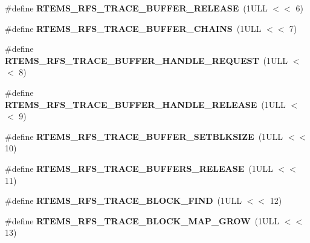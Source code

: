 \begin{DoxyCompactItemize}
\#define {\bfseries R\+T\+E\+M\+S\+\_\+\+R\+F\+S\+\_\+\+T\+R\+A\+C\+E\+\_\+\+B\+U\+F\+F\+E\+R\+\_\+\+R\+E\+L\+E\+A\+SE}~(1\+U\+L\+L $<$$<$ 6)
\item 
\mbox{\label{rtems-rfs-trace_8h_a85676d27626527c7b061e457e0925cf6}} 
\#define {\bfseries R\+T\+E\+M\+S\+\_\+\+R\+F\+S\+\_\+\+T\+R\+A\+C\+E\+\_\+\+B\+U\+F\+F\+E\+R\+\_\+\+C\+H\+A\+I\+NS}~(1\+U\+L\+L $<$$<$ 7)
\item 
\mbox{\label{rtems-rfs-trace_8h_ae50d0bc46ffc58f0a2e0de27a4263288}} 
\#define {\bfseries R\+T\+E\+M\+S\+\_\+\+R\+F\+S\+\_\+\+T\+R\+A\+C\+E\+\_\+\+B\+U\+F\+F\+E\+R\+\_\+\+H\+A\+N\+D\+L\+E\+\_\+\+R\+E\+Q\+U\+E\+ST}~(1\+U\+L\+L $<$$<$ 8)
\item 
\mbox{\label{rtems-rfs-trace_8h_ad2db0ae7536379e990df55424828d3be}} 
\#define {\bfseries R\+T\+E\+M\+S\+\_\+\+R\+F\+S\+\_\+\+T\+R\+A\+C\+E\+\_\+\+B\+U\+F\+F\+E\+R\+\_\+\+H\+A\+N\+D\+L\+E\+\_\+\+R\+E\+L\+E\+A\+SE}~(1\+U\+L\+L $<$$<$ 9)
\item 
\mbox{\label{rtems-rfs-trace_8h_ae5abddc9bd43a153fce1e339f076620a}} 
\#define {\bfseries R\+T\+E\+M\+S\+\_\+\+R\+F\+S\+\_\+\+T\+R\+A\+C\+E\+\_\+\+B\+U\+F\+F\+E\+R\+\_\+\+S\+E\+T\+B\+L\+K\+S\+I\+ZE}~(1\+U\+L\+L $<$$<$ 10)
\item 
\mbox{\label{rtems-rfs-trace_8h_a9e20f94a0225fd898aa4896b63861126}} 
\#define {\bfseries R\+T\+E\+M\+S\+\_\+\+R\+F\+S\+\_\+\+T\+R\+A\+C\+E\+\_\+\+B\+U\+F\+F\+E\+R\+S\+\_\+\+R\+E\+L\+E\+A\+SE}~(1\+U\+L\+L $<$$<$ 11)
\item 
\mbox{\label{rtems-rfs-trace_8h_a6ddd7ff4cbb5b11a317f419b89bc4faf}} 
\#define {\bfseries R\+T\+E\+M\+S\+\_\+\+R\+F\+S\+\_\+\+T\+R\+A\+C\+E\+\_\+\+B\+L\+O\+C\+K\+\_\+\+F\+I\+ND}~(1\+U\+L\+L $<$$<$ 12)
\item 
\mbox{\label{rtems-rfs-trace_8h_a398b117205504a3d7a0f20021b22f6b3}} 
\#define {\bfseries R\+T\+E\+M\+S\+\_\+\+R\+F\+S\+\_\+\+T\+R\+A\+C\+E\+\_\+\+B\+L\+O\+C\+K\+\_\+\+M\+A\+P\+\_\+\+G\+R\+OW}~(1\+U\+L\+L $<$$<$ 13)
\item 
\mbox{\label{rtems-rfs-trace_8h_a1ca750c5c14b94ec60bdee181b830759}} 

\end{DoxyCompactItemize}
